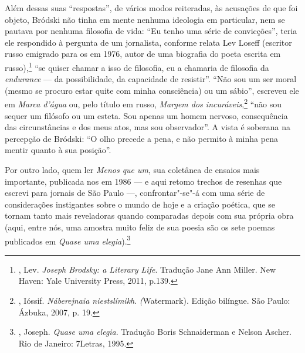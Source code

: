 Além dessas suas ``respostas'', de vários modos reiteradas, às
acusações de que foi objeto, Bródski não tinha em mente nenhuma
ideologia em particular, nem se pautava por nenhuma filosofia de vida:
``Eu tenho uma série de convicções'', teria ele respondido à
pergunta de um jornalista, conforme relata Lev Loseff (escritor russo emigrado
para os  em 1976, autor de uma biografia do poeta escrita
em russo),\footnote{, Lev. \emph{Joseph
 Brodsky: a Literary Life}. Tradução Jane Ann Miller. New Haven:
 Yale University Press, 2011, p.139.} ``se quiser
chamar a isso de filosofia, eu a chamaria de filosofia da
\emph{endurance} --- da possibilidade, da capacidade de resistir''.
``Não sou um ser moral (mesmo se procuro estar quite com minha
consciência) ou um sábio'', escreveu ele em \emph{Marca d'água} ou, pelo título em russo, \emph{Margem dos
incuráveis},\footnote{, Ióssif.
 \emph{Náberejnaia niestslímikh}. \emph(Watermark). Edição bilíngue.
 São Paulo: Ázbuka, 2007, p. 19.} ``não sou sequer um filósofo ou um
esteta. Sou apenas um homem nervoso, consequência das circunstâncias e
dos meus atos, mas sou observador''. A vista é soberana na percepção de
Bródski: ``O olho precede a pena, e não permito à minha pena mentir
quanto à sua posição''.

Por outro lado, quem ler \emph{Menos que um}, sua coletânea de ensaios
mais importante, publicada nos  em 1986 --- e aqui
retomo trechos de resenhas que escrevi para jornais de São Paulo ---,
confrontar"-se"-á com uma série de considerações instigantes sobre o mundo de hoje e a criação poética, que se tornam tanto mais
reveladoras quando comparadas depois com sua própria obra (aqui, entre
nós, uma amostra muito feliz de sua poesia são os sete poemas publicados
em \emph{Quase uma elegia}).\footnote{,
 Joseph. \emph{Quase uma elegia}. Tradução Boris Schnaiderman e Nelson
 Ascher. Rio de Janeiro: 7Letras, 1995.}

